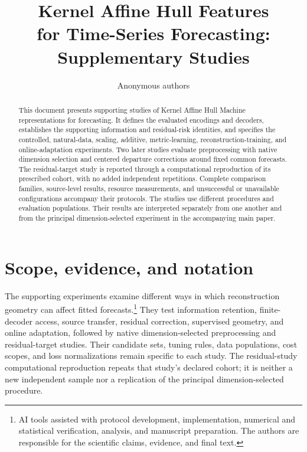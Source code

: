 \documentclass[10pt]{article}
\title{Kernel Affine Hull Features\\
for Time-Series Forecasting:\\Supplementary Studies}
\author{Anonymous authors}
\begin{document}
\maketitle
\begin{abstract}
This document presents supporting studies of Kernel Affine Hull Machine
representations for forecasting. It defines the evaluated encodings and
decoders, establishes the supporting information and residual-risk
identities, and specifies the controlled, natural-data, scaling, additive,
metric-learning, reconstruction-training, and online-adaptation experiments.
Two later studies evaluate preprocessing with native dimension selection
and centered departure corrections around fixed common forecasts. The
residual-target study is reported through a computational reproduction
of its prescribed cohort, with no added independent repetitions.
Complete comparison families, source-level results, resource measurements,
and unsuccessful or unavailable configurations accompany their protocols.
The studies use different procedures and evaluation populations. Their
results are interpreted separately from one another and from the
principal dimension-selected experiment in the accompanying main paper.
\end{abstract}

\section{Scope, evidence, and notation}\label{supp:scope}
The supporting experiments examine different ways in which reconstruction
geometry can affect fitted forecasts.\footnote{AI tools assisted with
protocol development, implementation, numerical and statistical
verification, analysis, and manuscript preparation. The authors are
responsible for the scientific claims, evidence, and final text.}
They test information retention, finite-decoder access, source transfer,
residual correction, supervised geometry, and online adaptation, followed
by native dimension-selected preprocessing and residual-target studies.
Their candidate sets, tuning rules, data populations, cost scopes, and
loss normalizations remain specific to each study. The residual-study
computational reproduction repeats that study's declared cohort; it is
neither a new independent sample nor a replication of the principal
dimension-selected procedure.
\end{document}
